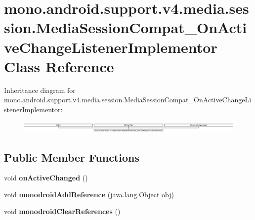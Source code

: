 \hypertarget{classmono_1_1android_1_1support_1_1v4_1_1media_1_1session_1_1MediaSessionCompat__OnActiveChangeListenerImplementor}{}\section{mono.\+android.\+support.\+v4.\+media.\+session.\+Media\+Session\+Compat\+\_\+\+On\+Active\+Change\+Listener\+Implementor Class Reference}
\label{classmono_1_1android_1_1support_1_1v4_1_1media_1_1session_1_1MediaSessionCompat__OnActiveChangeListenerImplementor}
Inheritance diagram for mono.\+android.\+support.\+v4.\+media.\+session.\+Media\+Session\+Compat\+\_\+\+On\+Active\+Change\+Listener\+Implementor\+:\begin{figure}[H]
\begin{center}
\leavevmode
\includegraphics[height=0.638177cm]{classmono_1_1android_1_1support_1_1v4_1_1media_1_1session_1_1MediaSessionCompat__OnActiveChangeListenerImplementor}
\end{center}
\end{figure}
\subsection*{Public Member Functions}
\begin{DoxyCompactItemize}
\item 
\hypertarget{classmono_1_1android_1_1support_1_1v4_1_1media_1_1session_1_1MediaSessionCompat__OnActiveChangeListenerImplementor_a0672dc8fe59e6c7a18b1755ca87be36d}{}void {\bfseries on\+Active\+Changed} ()\label{classmono_1_1android_1_1support_1_1v4_1_1media_1_1session_1_1MediaSessionCompat__OnActiveChangeListenerImplementor_a0672dc8fe59e6c7a18b1755ca87be36d}

\item 
\hypertarget{classmono_1_1android_1_1support_1_1v4_1_1media_1_1session_1_1MediaSessionCompat__OnActiveChangeListenerImplementor_a01e79fbddef692a8bb55ae13792dc8c4}{}void {\bfseries monodroid\+Add\+Reference} (java.\+lang.\+Object obj)\label{classmono_1_1android_1_1support_1_1v4_1_1media_1_1session_1_1MediaSessionCompat__OnActiveChangeListenerImplementor_a01e79fbddef692a8bb55ae13792dc8c4}

\item 
\hypertarget{classmono_1_1android_1_1support_1_1v4_1_1media_1_1session_1_1MediaSessionCompat__OnActiveChangeListenerImplementor_a9734f63b8b6ae5e64326da1f4b548bda}{}void {\bfseries monodroid\+Clear\+References} ()\label{classmono_1_1android_1_1support_1_1v4_1_1media_1_1session_1_1MediaSessionCompat__OnActiveChangeListenerImplementor_a9734f63b8b6ae5e64326da1f4b548bda}

\end{DoxyCompactItemize}


